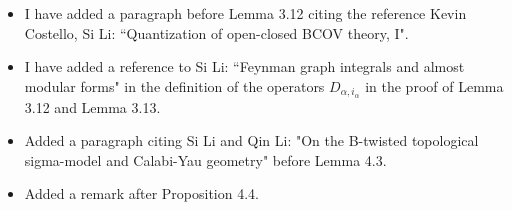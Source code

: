 \documentclass[10pt]{amsart}
\begin{document}
\begin{itemize}
\begin{itemize}
\item I have added a paragraph before Lemma 3.12 citing the reference Kevin Costello, Si Li: ``Quantization of open-closed BCOV theory, I".
\item I have added a reference to Si Li: ``Feynman graph integrals and almost modular forms" in the definition of the operators $D_{\alpha,i_\alpha}$ in the proof of Lemma 3.12 and Lemma 3.13. 
\item Added a paragraph citing Si Li and Qin Li: "On the B-twisted topological sigma-model and Calabi-Yau geometry" before Lemma 4.3. 
\item Added a remark after Proposition 4.4. 

\end{itemize}



\end{itemize}
\end{document}
